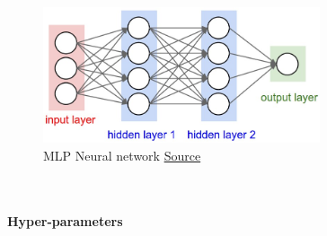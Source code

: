 \documentclass[11pt,a4paper,UKenglish]{article}
\begin{document}
\begin{figure}[H]
  \centering
  \includegraphics[height=4cm]{res/neural_net2.jpeg}
  \caption{MLP Neural network \href{http://cs231n.github.io/neural-networks-1/}{Source}}
  \label{fig:neural_net2}
\end{figure}


\noindent \\
\noindent \\ \textbf{Hyper-parameters}
\end{document}
